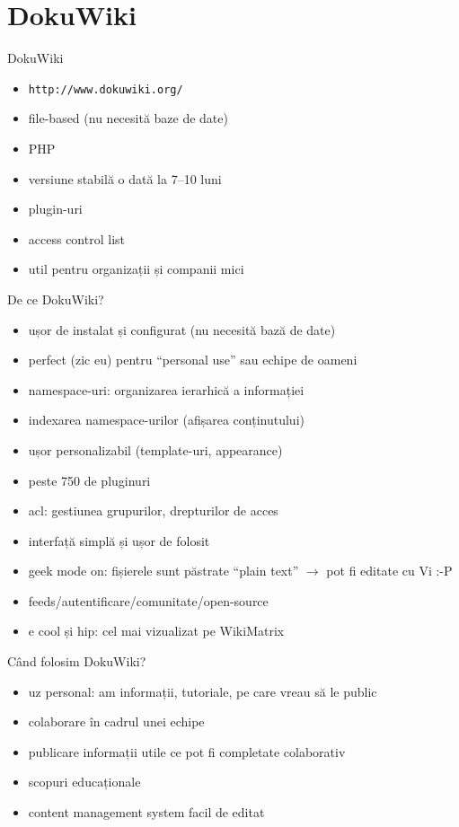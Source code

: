\documentclass{beamer}
\begin{document}
\section{DokuWiki}

\begin{frame}{DokuWiki}
  \begin{itemize}
    \item \texttt{http://www.dokuwiki.org/}
    \item file-based (nu necesită baze de date)
    \item PHP
    \item versiune stabilă o dată la 7--10 luni
    \item plugin-uri
    \item access control list
    \item util pentru organizații și companii mici
  \end{itemize}
\end{frame}

\begin{frame}{De ce DokuWiki?}
  \begin{itemize}
    \item ușor de instalat și configurat (nu necesită bază de date)
    \item perfect (zic eu) pentru ``personal use'' sau echipe de oameni
    \item namespace-uri: organizarea ierarhică a informației
    \item indexarea namespace-urilor (afișarea conținutului)
    \item ușor personalizabil (template-uri, appearance)
    \item peste 750 de pluginuri
    \item acl: gestiunea grupurilor, drepturilor de acces
    \item interfață simplă și ușor de folosit
    \item geek mode on: fișierele sunt păstrate ``plain text'' $\rightarrow$ pot
    fi editate cu Vi :-P
    \item feeds/autentificare/comunitate/open-source
    \item e cool și hip: cel mai vizualizat pe WikiMatrix
  \end{itemize}
\end{frame}

\begin{frame}{Când folosim DokuWiki?}
  \begin{itemize}
    \item uz personal: am informații, tutoriale, pe care vreau să le public
    \item colaborare în cadrul unei echipe
    \item publicare informații utile ce pot fi completate colaborativ
    \item scopuri educaționale
    \item content management system facil de editat
  \end{itemize}
\end{frame}
\end{document}
